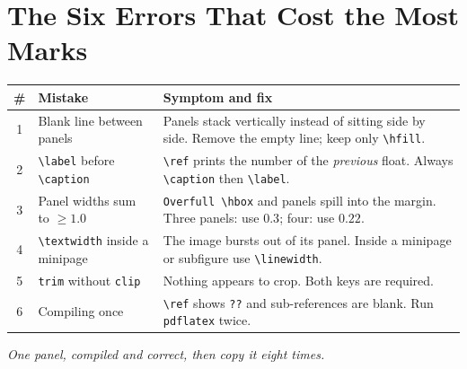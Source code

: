 \documentclass[11pt]{article}
\begin{document}
\section*{The Six Errors That Cost the Most Marks}

\renewcommand{\arraystretch}{1.4}
\begin{tabularx}{\textwidth}{|c|l|X|}
\hline
\textbf{\#} & \textbf{Mistake} & \textbf{Symptom and fix} \\
\hline
1 & Blank line between panels &
  Panels stack vertically instead of sitting side by side. Remove the empty
  line; keep only \verb|\hfill|. \\
\hline
2 & \verb|\label| before \verb|\caption| &
  \verb|\ref| prints the number of the \emph{previous} float. Always
  \verb|\caption| then \verb|\label|. \\
\hline
3 & Panel widths sum to $\geq 1.0$ &
  \texttt{Overfull \textbackslash hbox} and panels spill into the margin.
  Three panels: use $0.3$; four: use $0.22$. \\
\hline
4 & \verb|\textwidth| inside a minipage &
  The image bursts out of its panel. Inside a minipage or subfigure use
  \verb|\linewidth|. \\
\hline
5 & \verb|trim| without \verb|clip| &
  Nothing appears to crop. Both keys are required. \\
\hline
6 & Compiling once &
  \verb|\ref| shows \texttt{??} and sub-references are blank. Run
  \texttt{pdflatex} twice. \\
\hline
\end{tabularx}

\vfill
\begin{center}\small\itshape
One panel, compiled and correct, then copy it eight times.
\end{center}
\end{document}

